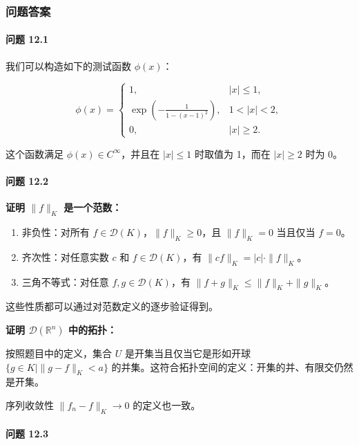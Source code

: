 \subsubsection{问题答案}\label{ux95eeux9898ux7b54ux6848}

\paragraph{问题 12.1}

我们可以构造如下的测试函数 $\phi(x)$：

$$
\phi(x) =
\begin{cases}
1, & |x| \leq 1, \\
\exp(-\frac{1}{1 - (x - 1)^2}), & 1 < |x| < 2, \\
0, & |x| \geq 2.
\end{cases}
$$

这个函数满足 $\phi(x) \in C^\infty$，并且在 $|x| \leq 1$ 时取值为
1，而在 $|x| \geq 2$ 时为 0。

\paragraph{问题 12.2}\label{ux95eeux9898-12.2}

\textbf{证明 $\|f\|_K$ 是一个范数：}

\begin{enumerate}

\item
  非负性：对所有 $f \in \mathcal{D}(K)$，$\|f\|_K \geq 0$，且
  $\|f\|_K = 0$ 当且仅当 $f = 0$。
\item
  齐次性：对任意实数 $c$ 和 $f \in \mathcal{D}(K)$，有
  $\|cf\|_K = |c| \cdot \|f\|_K$。
\item
  三角不等式：对任意 $f, g \in \mathcal{D}(K)$，有
  $\|f + g\|_K \leq \|f\|_K + \|g\|_K$。
\end{enumerate}

这些性质都可以通过对范数定义的逐步验证得到。

\textbf{证明 $\mathcal{D}(\mathbb{R}^n)$ 中的拓扑：}

按照题目中的定义，集合 $U$ 是开集当且仅当它是形如开球
$\{g \in K \mid \|g - f\|_K < a\}$
的并集。这符合拓扑空间的定义：开集的并、有限交仍然是开集。

序列收敛性 $\|f_n - f\|_K \to 0$ 的定义也一致。

\paragraph{问题 12.3}\label{ux95eeux9898-12.3}

